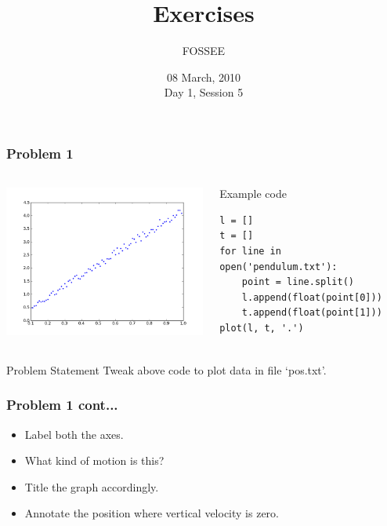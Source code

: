 \documentclass[14pt,compress]{beamer}
\title[Exercises]{Exercises}
\author[FOSSEE] {FOSSEE}
\institute[IIT Bombay] {Department of Aerospace Engineering\\IIT Bombay}
\date[] {08 March, 2010\\Day 1, Session 5}
\begin{document}
\begin{frame}
  \titlepage
\end{frame}


\begin{frame}[fragile]
  \frametitle{Problem 1}
  \begin{columns}
    \hspace*{-0.5in}
    \includegraphics[height=2in, interpolate=true]{data/L-Tsq.png}
    \begin{block}{Example code}
    \tiny
    \begin{lstlisting}
l = []
t = []
for line in open('pendulum.txt'):
    point = line.split()
    l.append(float(point[0]))
    t.append(float(point[1]))
plot(l, t, '.')
    \end{lstlisting}
    \end{block}
  \end{columns}
  \begin{block}{Problem Statement}
    Tweak above code to plot data in file `pos.txt'.
  \end{block}
\end{frame}

\begin{frame}
  \frametitle{Problem 1 cont...}
  \begin{itemize}
  \item Label both the axes.
  \item What kind of motion is this?
  \item Title the graph accordingly.
  \item Annotate the position where vertical velocity is zero.
  \end{itemize}
\end{frame}
\end{document}
